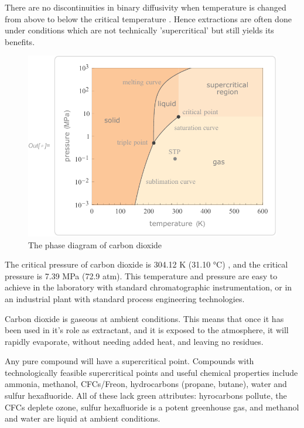 There are no discontinuities in binary diffusivity when temperature is changed
from above to below the critical temperature \autocite{Lauer1983}. Hence
extractions are often done under conditions which are not technically
'supercritical' but still yields its benefits.


\begin{figure}
\centering
\includegraphics[width=\textwidth]{Figures/CO2PhaseDiagram}
\decoRule
\caption[The carbon dioxide phase diagram]{The phase diagram of carbon dioxide}
\label{fig:co2phase}
\end{figure}

The critical pressure of carbon dioxide is 304.12 K (31.10 °C) , and the
critical pressure is 7.39 MPa (72.9 atm). This temperature and pressure are easy
to achieve in the laboratory with standard chromatographic instrumentation, or
in an industrial plant with standard process engineering technologies.

Carbon dioxide is gaseous at ambient conditions. This means that once it has
been used in it's role as extractant, and it is exposed to the atmosphere, it
will rapidly evaporate, without needing added heat, and leaving no residues.

Any pure compound will have a supercritical point. Compounds with
technologically feasible supercritical points and useful chemical properties
include ammonia, methanol, CFCs/Freon, hydrocarbons (propane, butane), water and
sulfur hexafluoride. All of these lack green attributes: hyrocarbons pollute,
the CFCs deplete ozone, sulfur hexafluoride is a potent greenhouse gas, and
methanol and water are liquid at ambient conditions.

